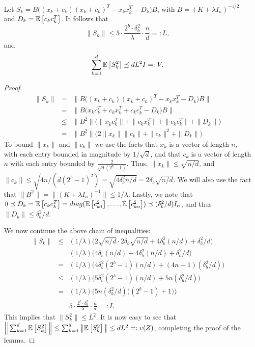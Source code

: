 \documentclass[12pt]{article}
\newcommand{\eqdef}{=:}
\begin{document}
\begin{lemma}
	\label{upper_bounds}
	Let $S_k = B\Big((x_k + c_k)(x_k + c_k)^T  - x_k x_k^T - D_k\Big)B$, with $B=(K+\lambda I_n)^{-1/2}$ and $D_k=\expect{}{c_k c_k^T}$.  It follows that
	$$\|S_k\| \leq 5 \cdot \frac{2^b \cdot \delta_b^2}{\lambda}\cdot  \frac{n}{d} \eqdef L,$$
	and
	$$\sum_{k=1}^d \expect{}{S_k^2} \preceq dL^2 I \eqdef V.$$
\end{lemma}
\begin{proof}
\begin{eqnarray*}
\|S_k\| &=& \|B\Big((x_k + c_k)(x_k + c_k)^T  - x_k x_k^T - D_k\Big)B\| \\
&=& \|B\Big(x_kc_k^T + c_kx_k^T + c_k c_k^T - D_k\Big)B\| \\
&\leq& \|B^2\|\Big(\|x_kc_k^T\| + \|c_kx_k^T\| + \|c_k c_k^T\| + \|D_k\|\Big) \\
&=& \|B^2\|\Big(2\|x_k\|\|c_k\| + \|c_k\|^2 + \|D_k\|\Big) 
\end{eqnarray*}
To bound $\|x_k\|$ and $\|c_k\|$ we use the facts that $x_k$ is a vector of length $n$, with each entry bounded in magnitude by $1/\sqrt{d}$, and that $c_k$ is a vector of length $n$ with each entry bounded by $\frac{2}{\sqrt{d}(2^b-1)}$.  Thus, $\|x_k\| \leq \sqrt{n/d}$, and $\|c_k\| \leq \sqrt{4n/(d(2^b-1)^2)} = \sqrt{4\delta_b^2n/d} = 2\delta_b\sqrt{n/d}$.  We will also use the fact that $\|B^2\| = \|(K+\lambda I_n)^{-1}\| \leq 1/\lambda$.  Lastly, we note that $0 \preceq D_k = \expect{}{c_k c_k^T} = diag(\expect{}{c_{k1}^2},\ldots,\expect{}{c_{kn}^2}) \preceq (\delta_b^2/d) I_n$, and thus $\|D_k\| \leq \delta_b^2/d$.

We now continue the above chain of inequalities:
\begin{eqnarray*}
\|S_k\| &\leq& (1/\lambda)\Big(2\sqrt{n/d}\cdot 2\delta_b\sqrt{n/d} + 4\delta_b^2(n/d) + \delta_b^2/d\Big)\\
&=& (1/\lambda)\Big(4\delta_b(n/d) + 4\delta_b^2(n/d) + \delta_b^2/d\Big) \\
&=& (1/\lambda)\Big(4\delta_b^2(2^b-1)(n/d) + (4n + 1)(\delta_b^2/d)\Big) \\
&\leq& (1/\lambda)\Big(5\delta_b^2(2^b-1)(n/d) + 5n(\delta_b^2/d)\Big) \\
&=& (1/\lambda)\Big(5n(\delta_b^2/d)\Big((2^b-1)+1\Big)\Big) \\
&=& 5 \cdot \frac{2^b \cdot \delta_b^2}{\lambda}\cdot  \frac{n}{d} \eqdef L
\end{eqnarray*}
This implies that $\|S_k^2\| \leq L^2$.  It is now easy to see that 
$\Big\|\sum_{k=1}^d \expect{}{S_k^2}\Big\| \leq \sum_{k=1}^d \big\|\expect{}{S_k^2}\big\| \leq dL^2 \eqdef v(Z)$, completing the proof of the lemma.



\end{proof}
\end{document}
